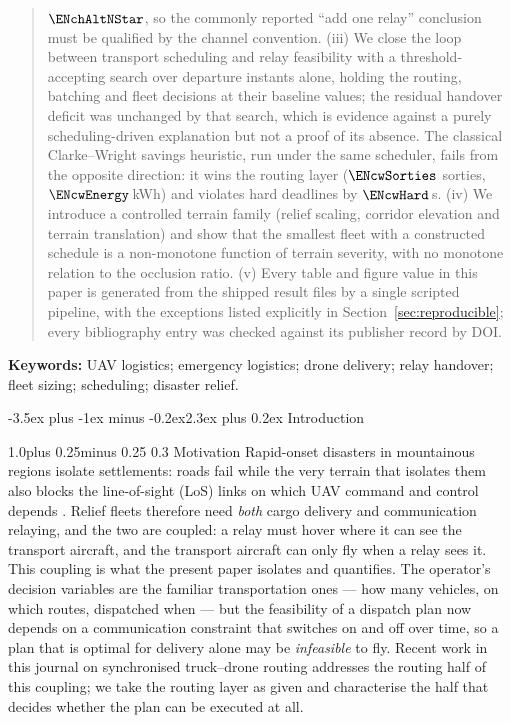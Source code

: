 \documentclass[11pt]{article}
\makeatletter
\def\section{\@startsection{section}{1}{\z@}%
    {1.0\baselineskip plus 0.25\baselineskip minus 0.25\baselineskip}%
    {0.4\baselineskip}%
    {\normalfont\normalsize\centering\bfseries}}%
\def\subsection{\@startsection{subsection}{2}{\z@}%
    {1.0\baselineskip plus 0.25\baselineskip minus 0.25\baselineskip}%
    {0.3\baselineskip}%
    {\normalfont\normalsize\itshape}}%
\renewcommand{\section}{\@startsection{section}{1}{\z@}%
      {-3.5ex plus -1ex minus -0.2ex}{2.3ex plus 0.2ex}%
      {\normalfont\Large\bfseries}}%
\renewcommand{\section}{\@startsection{section}{1}{\z@}%
      {-3.5ex plus -1ex minus -0.2ex}{2.3ex plus 0.2ex}%
      {\normalfont\large\bfseries}}%
\theoremstyle{dshplain}
\theoremstyle{dshdefn}
\makeatother
\begin{document}
\begin{abstract}
$\ENchAltNStar$, so the commonly reported ``add one relay''
conclusion must be qualified by the channel convention.
(iii) We close the loop between transport scheduling and relay feasibility with
a threshold-accepting search over departure instants alone, holding the routing,
batching and fleet decisions at their baseline values; the residual handover
deficit was unchanged by that search, which is evidence against a purely
scheduling-driven explanation but not a proof of its absence. The classical
Clarke--Wright savings heuristic, run under the same scheduler, fails from the
opposite direction: it wins the routing layer
($\ENcwSorties$ sorties, $\ENcwEnergy$\,kWh) and violates hard deadlines by
$\ENcwHard$\,s.
(iv) We introduce a controlled terrain family (relief scaling, corridor
elevation and terrain translation) and show that the smallest fleet with a
constructed schedule is a non-monotone function of terrain severity, with no
monotone relation to the occlusion ratio.
(v) Every table and figure value in this paper is generated from the shipped
result files by a single scripted pipeline, with the exceptions listed explicitly
in Section~\ref{sec:reproducible}; every bibliography entry was checked against
its publisher record by DOI.
\end{abstract}

\noindent\textbf{Keywords:} UAV logistics; emergency logistics; drone delivery;
relay handover; fleet sizing; scheduling; disaster relief.

\section{Introduction}
\label{sec:intro}

\subsection{Motivation}
Rapid-onset disasters in mountainous regions isolate settlements: roads fail
while the very terrain that isolates them also blocks the line-of-sight (LoS)
links on which UAV command and control depends \cite{sheu2007,caunhye2012,
erdelj,otto2018}. Relief fleets therefore need \emph{both} cargo delivery
and communication relaying, and the two are coupled: a relay must hover where it
can see the transport aircraft, and the transport aircraft can only fly when a
relay sees it. This coupling is what the present paper isolates and quantifies.
The operator's decision variables are the familiar transportation ones --- how
many vehicles, on which routes, dispatched when --- but the feasibility of a
dispatch plan now depends on a communication constraint that switches on and
off over time, so a plan that is optimal for delivery alone may be
\emph{infeasible} to fly. Recent work in this journal on synchronised
truck--drone routing \cite{das2021,bian2024} addresses the routing half of this
coupling; we take the routing layer as given and characterise the half that
decides whether the plan can be executed at all.
\end{document}
